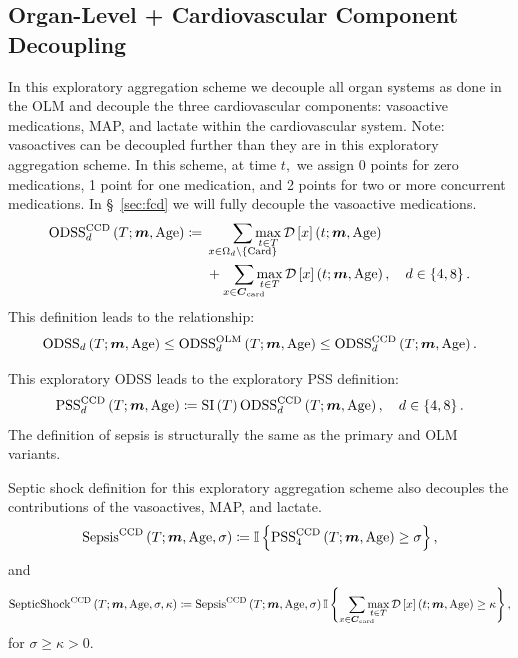 \documentclass[letterpaper,10pt]{article}
\begin{document}
\subsection{Organ-Level + Cardiovascular Component Decoupling}\label{sec:ccd}

In this exploratory aggregation scheme we decouple all organ systems as done in
the OLM
and decouple the three cardiovascular components: vasoactive medications, MAP,
and lactate within the cardiovascular system.  Note: vasoactives can be
decoupled further than they are in this exploratory aggregation scheme.  In this
scheme, at time $t,$ we assign 0 points for zero medications, 1 point for one
medication, and 2 points for two or more concurrent medications.  In
\S~\ref{sec:fcd} we will fully decouple the vasoactive medications.
\begin{equation}
  \label{eq:odss-ccd}
  \begin{aligned}
    \ODSS{d}[CCD] \coloneqq{}&
    \smashoperator[r]{\sum_{x \in \Omega_{d}\setminus \left\{\mathrm{Card}\right\}}} \maxtinT \DS*{x}
    \\
    &+ \smashoperator[r]{\sum_{x \in \Ccard}} \maxtinT \DS*{x},
    \quad d \in \left\{4, 8\right\}.
  \end{aligned}
\end{equation}
This definition leads to the relationship:
\begin{equation}
  \label{eq:odss-ccd-bound}
  \ODSS{d} \leq \ODSS{d}[OLM] \leq \ODSS{d}[CCD].
\end{equation}

This exploratory ODSS leads to the exploratory PSS definition:
\begin{equation}
  \label{eq:pss-ccd}
  \PSS{d}[CCD] \coloneqq \SI \ODSS{d}[CCD], \quad d \in \left\{4, 8\right\}.
\end{equation}
The definition of sepsis is structurally the same as the primary and OLM
variants.

Septic shock definition for this exploratory aggregation scheme also decouples
the contributions of the vasoactives, MAP, and lactate.
\begin{equation}
  \label{eq:sepsis-ccd}
  \Sepsis[CCD] \coloneqq
  \mathbb{I} \left\{\PSS{4}[CCD] \geq \sigma \right\},
\end{equation}
and
\begin{equation}
  \label{eq:septicshock-ccd}
  \SepticShock[CCD]\coloneqq
  \Sepsis[CCD]
  \mathbb{I} \left\{ \smashoperator[r]{\sum_{x \in \Ccard}} \maxtinT \DS*{x} \geq \kappa\right\},
\end{equation}
for $\sigma \geq \kappa > 0.$
\end{document}
